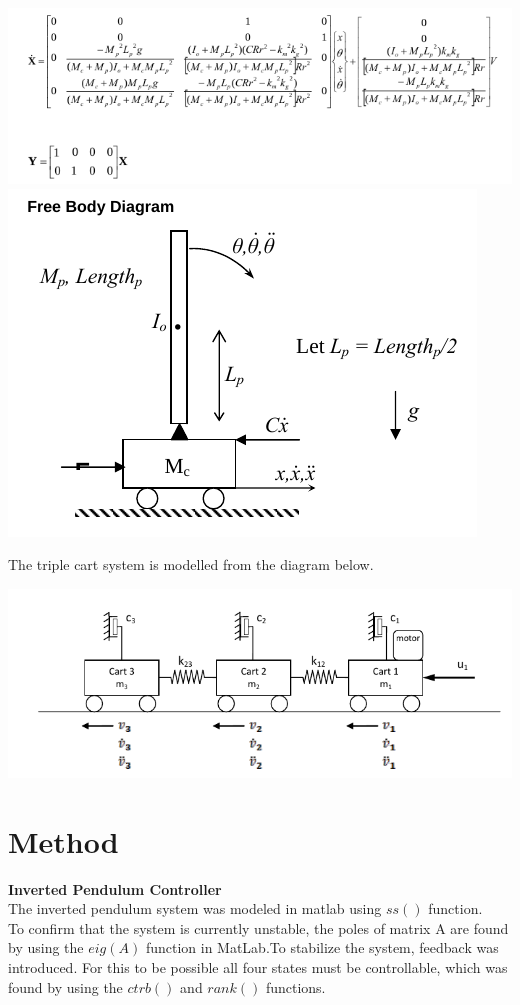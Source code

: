 \documentclass[a4paper,12pt]{article}
\begin{document}
\begin{center}
\includegraphics[scale=0.4]{iP_matrix.png}
\includegraphics[scale=0.3]{iP_diagram.png}\\
\end{center}
\noindent
The triple cart system is modelled from the diagram below.
\begin{center}
\includegraphics[scale=0.3]{3cart_diagram.png}\\
\end{center}



\clearpage
\section{Method}
\textbf{Inverted Pendulum Controller}\\
The inverted pendulum system was modeled in matlab using $ss()$ function.\\
To confirm that the system is currently unstable, the poles of matrix A are found by using the $eig(A)$ function in MatLab.To stabilize the system, feedback was introduced. For this to be possible all four states must be controllable, which was found by using the $ctrb()$ and $rank()$ functions.\\
\end{document}
